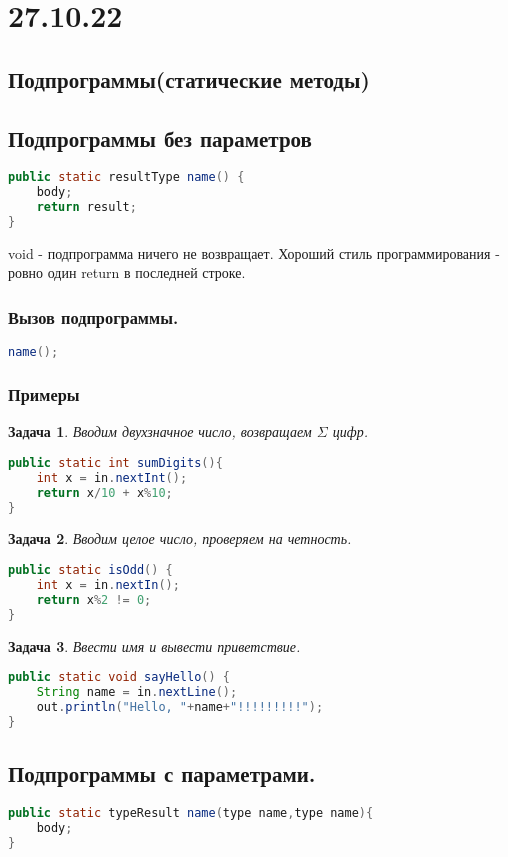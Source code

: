 \documentclass{article}
\newtheorem{task}{Задача}
\begin{document}
\section{27.10.22}
\subsection{Подпрограммы(статические методы)}
\subsection{Подпрограммы без параметров}
\begin{lstlisting}[language=Java] 
public static resultType name() {
    body;
    return result;
}
\end{lstlisting} 
void - подпрограмма ничего не возвращает. Хороший стиль программирования - ровно один return в последней строке.
\subsubsection{Вызов подпрограммы.}
\begin{lstlisting}[language=Java] 
name();
\end{lstlisting} 
\subsubsection{Примеры}
\begin{task}
    Вводим двухзначное число, возвращаем $\Sigma$ цифр.
\end{task}
\begin{lstlisting}[language=Java] 
public static int sumDigits(){
    int x = in.nextInt();
    return x/10 + x%10;
}
\end{lstlisting} 
\begin{task}
    Вводим целое число, проверяем на четность.
\end{task}
\begin{lstlisting}[language=Java] 
public static isOdd() {
    int x = in.nextIn();
    return x%2 != 0;
}
\end{lstlisting} 
\begin{task}
    Ввести имя и вывести приветствие.
\end{task}
\begin{lstlisting}[language=Java] 
public static void sayHello() {
    String name = in.nextLine();
    out.println("Hello, "+name+"!!!!!!!!!");
}
\end{lstlisting} 
\subsection{Подпрограммы с параметрами.}
\begin{lstlisting}[language=Java] 
public static typeResult name(type name,type name){
    body;
} 
\end{lstlisting} 
\end{document}
